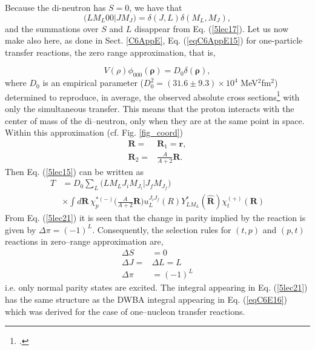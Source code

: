 Because the di-neutron has $S=0$, we have that
\begin{equation}\label{5lec18}
 \bigl( L M_L 0 0|J M_{J} \bigr)=\delta(J,L)\delta(M_L,M_J),
\end{equation}
and the summations over $S$ and $L$ disappear from Eq. (\ref{5lec17}). Let us now  make also here, as done in Sect. \ref{C6AppE}, Eq. (\ref{eqC6AppE15}) for one-particle transfer reactions, the zero range approximation, that is,


\begin{equation}\label{5lec19}
V(\rho) \phi_{000}(\pmb \rho)=D_0 \delta(\pmb \rho),
\end{equation}
where $D_0$ is an empirical parameter ($D_0^2=(31.6\pm9.3)\times10^4$ MeV$^2$fm$^2$) determined to reproduce, in average, the observed absolute cross sections\footnote{\cite{Broglia:73}.} with only the simultaneous transfer.
This means that the proton interacts with the center of mass of the di--neutron, only when they are at the same point in space.
Within this approximation (cf. Fig. \ref{fig_coord})
\begin{equation}\label{5lec20}
\begin{split}
\mathbf R=&\mathbf R_1=\mathbf r,\\
\mathbf R_2=&\frac{A}{A+2}\mathbf R.
\end{split}
\end{equation}
Then Eq. (\ref{5lec15}) can be written as
\begin{equation}\label{5lec21}
\begin{split}
T&= D_0 \sum_L \bigl( L M_L J_i M_{J_i}|J_f M_{J_f} \bigr) \\
&\times \int d\mathbf R\, \chi^{*(-)}_p\bigl(\frac{A}{A+2}\mathbf R\bigr)
 u^{J_i J_f}_{L}(R) Y_{L M_L}^*(\mathbf{\hat R}) \chi^{(+)}_t(\mathbf R)
\end{split}
\end{equation}
From Eq. (\ref{5lec21}) it is seen that the change in parity implied by the reaction is given by $\Delta\pi=(-1)^L$. Consequently, the selection rules for $(t,p)$ and  $(p,t)$ reactions in zero--range approximation are,
\begin{equation}\label{5lec22}
\begin{split}
\Delta S&=0\\
\Delta J=&\Delta L=L \\
\Delta\pi&=(-1)^L
\end{split}
\end{equation}
i.e. only normal parity states are excited.
The integral appearing in Eq. (\ref{5lec21}) has the same structure as the DWBA integral appearing in Eq. (\ref{eqC6E16}) which was derived for the case of one--nucleon transfer reactions.


